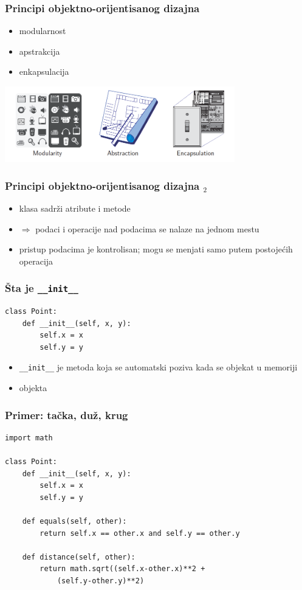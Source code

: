 \documentclass[utf8,compress,aspectratio=169]{beamer}
\begin{document}
\begin{frame}[fragile]
  \frametitle{Principi objektno-orijentisanog dizajna}
  \begin{itemize}
    \item modularnost
    \item apstrakcija
    \item enkapsulacija
  \end{itemize}
\begin{center}
  \includegraphics[width=10cm]{pic32.png}
\end{center}
\end{frame}

\begin{frame}[fragile]
  \frametitle{Principi objektno-orijentisanog dizajna $_2$}
  \begin{itemize}
    \item klasa sadrži atribute i metode
    \item $\Rightarrow$ podaci i operacije nad podacima se nalaze na jednom mestu
    \item pristup podacima je kontrolisan; mogu se menjati samo putem postojećih operacija
  \end{itemize}
\end{frame}

\begin{frame}[fragile]
  \frametitle{Šta je \texttt{\_\_init\_\_}}
\begin{verbatim}
class Point:
    def __init__(self, x, y):
        self.x = x
        self.y = y
\end{verbatim}
  \begin{itemize}
    \item \texttt{\_\_init\_\_} je metoda koja se automatski poziva kada se objekat  u memoriji
    \item {} objekta
  \end{itemize}
\end{frame}

\begin{frame}
  \frametitle{Primer: tačka, duž, krug}
\begin{verbatim}
import math

class Point:
    def __init__(self, x, y):
        self.x = x
        self.y = y

    def equals(self, other):
        return self.x == other.x and self.y == other.y

    def distance(self, other):
        return math.sqrt((self.x-other.x)**2 +
            (self.y-other.y)**2)
\end{verbatim}
\end{frame}
\end{document}
